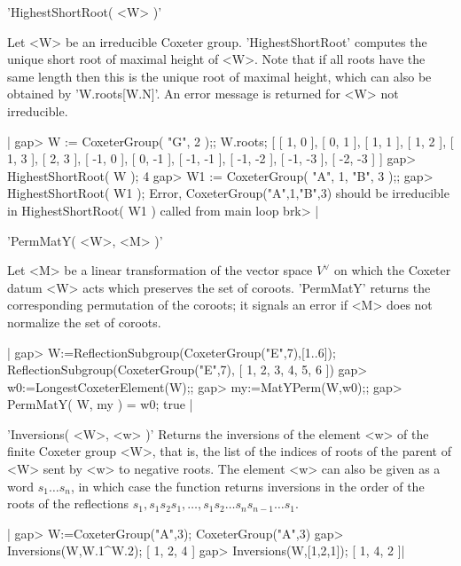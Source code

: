 
'HighestShortRoot( <W> )'

Let <W> be an irreducible Coxeter  group. 'HighestShortRoot' computes the
unique short root of maximal height of <W>.  Note that  if all roots have
the same length then this is the unique root of maximal height, which can
also be obtained by 'W.roots[W.N]'.  An error message is returned for <W>
not irreducible.

|    gap> W := CoxeterGroup( "G", 2 );;  W.roots;
    [ [ 1, 0 ], [ 0, 1 ], [ 1, 1 ], [ 1, 2 ], [ 1, 3 ], [ 2, 3 ],
      [ -1, 0 ], [ 0, -1 ], [ -1, -1 ], [ -1, -2 ], [ -1, -3 ],
      [ -2, -3 ] ]
    gap> HighestShortRoot( W );
    4
    gap> W1 := CoxeterGroup( "A", 1, "B", 3 );;
    gap> HighestShortRoot( W1 );
    Error,  CoxeterGroup("A",1,"B",3) should be irreducible
     in
    HighestShortRoot( W1 ) called from
    main loop
    brk> |


'PermMatY( <W>, <M> )'

Let <M> be a linear transformation of  the vector space $V^\vee$ on which
the Coxeter    datum  <W> acts  which  preserves    the  set of  coroots.
'PermMatY'  returns  the  corresponding permutation of    the coroots; it
signals an error if <M> does not normalize the set of coroots.

|    gap>  W:=ReflectionSubgroup(CoxeterGroup("E",7),[1..6]);
    ReflectionSubgroup(CoxeterGroup("E",7), [ 1, 2, 3, 4, 5, 6 ])
    gap>  w0:=LongestCoxeterElement(W);;
    gap> my:=MatYPerm(W,w0);;
    gap> PermMatY( W, my ) = w0;
    true |


'Inversions( <W>, <w> )'
Returns  the inversions of the element <w> of the finite Coxeter group <W>,
that  is, the list of the indices of roots of the parent of <W> sent by <w>
to  negative roots. The element <w> can  also be given as a word $s_1\ldots
s_n$,  in which case  the function returns  inversions in the  order of the
roots  of  the  reflections  $s_1,  s_1  s_2  s_1,\ldots,s_1  s_2\ldots s_n
s_{n-1}\ldots s_1$.

|    gap> W:=CoxeterGroup("A",3);
    CoxeterGroup("A",3)
    gap> Inversions(W,W.1^W.2);
    [ 1, 2, 4 ]
    gap> Inversions(W,[1,2,1]);
    [ 1, 4, 2 ]|


